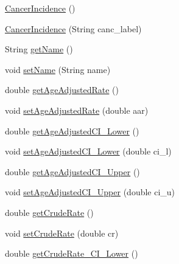 \begin{DoxyCompactItemize}
\item 
\mbox{\hyperlink{classbridges_1_1data__src__dependent_1_1_cancer_incidence_a92db1eb4292c77f07619019587caf5cc}{Cancer\+Incidence}} ()
\item 
\mbox{\hyperlink{classbridges_1_1data__src__dependent_1_1_cancer_incidence_a3db553c2769892563c3f1ebb033ba4c6}{Cancer\+Incidence}} (String canc\+\_\+label)
\item 
String \mbox{\hyperlink{classbridges_1_1data__src__dependent_1_1_cancer_incidence_ac7958f37807979cf06e712373f080b9a}{get\+Name}} ()
\item 
void \mbox{\hyperlink{classbridges_1_1data__src__dependent_1_1_cancer_incidence_a1aef58b128adfd1e2a31ab9726247e9e}{set\+Name}} (String name)
\item 
double \mbox{\hyperlink{classbridges_1_1data__src__dependent_1_1_cancer_incidence_a87bc1cbc5a72eb9b4df5ff7ab4843ae8}{get\+Age\+Adjusted\+Rate}} ()
\item 
void \mbox{\hyperlink{classbridges_1_1data__src__dependent_1_1_cancer_incidence_a26c2d63e8465bcfdab047129312b4897}{set\+Age\+Adjusted\+Rate}} (double aar)
\item 
double \mbox{\hyperlink{classbridges_1_1data__src__dependent_1_1_cancer_incidence_a7e5dab6d140f2a8e162c5d5c514c74c1}{get\+Age\+Adjusted\+C\+I\+\_\+\+Lower}} ()
\item 
void \mbox{\hyperlink{classbridges_1_1data__src__dependent_1_1_cancer_incidence_a4cd8ce7c68f00d2cd15928764cc32c09}{set\+Age\+Adjusted\+C\+I\+\_\+\+Lower}} (double ci\+\_\+l)
\item 
double \mbox{\hyperlink{classbridges_1_1data__src__dependent_1_1_cancer_incidence_ae7b71d91c3acae9fce3536f6a9d8362b}{get\+Age\+Adjusted\+C\+I\+\_\+\+Upper}} ()
\item 
void \mbox{\hyperlink{classbridges_1_1data__src__dependent_1_1_cancer_incidence_aeb386486bfbd96ba9ab689b7d95d4522}{set\+Age\+Adjusted\+C\+I\+\_\+\+Upper}} (double ci\+\_\+u)
\item 
double \mbox{\hyperlink{classbridges_1_1data__src__dependent_1_1_cancer_incidence_afc2ddb3099dffc46371ad7188278501d}{get\+Crude\+Rate}} ()
\item 
void \mbox{\hyperlink{classbridges_1_1data__src__dependent_1_1_cancer_incidence_a64a737fd7481262650efd596c508ffd6}{set\+Crude\+Rate}} (double cr)
\item 
double \mbox{\hyperlink{classbridges_1_1data__src__dependent_1_1_cancer_incidence_a8c410730b03abc78395e75b5024d495e}{get\+Crude\+Rate\+\_\+\+C\+I\+\_\+\+Lower}} ()

\end{DoxyCompactItemize}
